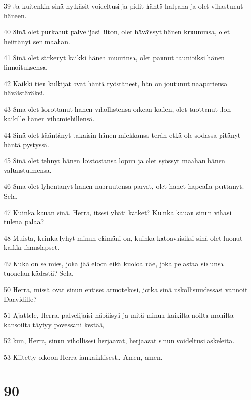 \par 39 Ja kuitenkin sinä hylkäsit voideltusi ja pidit häntä halpana ja olet vihastunut häneen.
\par 40 Sinä olet purkanut palvelijasi liiton, olet häväissyt hänen kruununsa, olet heittänyt sen maahan.
\par 41 Sinä olet särkenyt kaikki hänen muurinsa, olet pannut raunioiksi hänen linnoituksensa.
\par 42 Kaikki tien kulkijat ovat häntä ryöstäneet, hän on joutunut naapuriensa häväistäväksi.
\par 43 Sinä olet korottanut hänen vihollistensa oikean käden, olet tuottanut ilon kaikille hänen vihamiehillensä.
\par 44 Sinä olet kääntänyt takaisin hänen miekkansa terän etkä ole sodassa pitänyt häntä pystyssä.
\par 45 Sinä olet tehnyt hänen loistostansa lopun ja olet syössyt maahan hänen valtaistuimensa.
\par 46 Sinä olet lyhentänyt hänen nuoruutensa päivät, olet hänet häpeällä peittänyt. Sela.
\par 47 Kuinka kauan sinä, Herra, itsesi yhäti kätket? Kuinka kauan sinun vihasi tulena palaa?
\par 48 Muista, kuinka lyhyt minun elämäni on, kuinka katoavaisiksi sinä olet luonut kaikki ihmislapset.
\par 49 Kuka on se mies, joka jää eloon eikä kuoloa näe, joka pelastaa sielunsa tuonelan kädestä? Sela.
\par 50 Herra, missä ovat sinun entiset armotekosi, jotka sinä uskollisuudessasi vannoit Daavidille?
\par 51 Ajattele, Herra, palvelijaisi häpäisyä ja mitä minun kaikilta noilta monilta kansoilta täytyy povessani kestää,
\par 52 kun, Herra, sinun vihollisesi herjaavat, herjaavat sinun voideltusi askeleita.
\par 53 Kiitetty olkoon Herra iankaikkisesti. Amen, amen.

\chapter{90}

